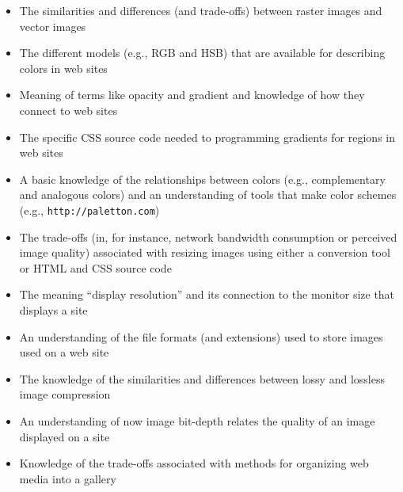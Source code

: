 \documentclass[11pt]{article}
\newcommand{\program}[1]{\lstinline{#1}}
\begin{document}
\begin{itemize}

  \itemsep 0in

  \item The similarities and differences (and trade-offs) between raster images
    and vector images

  \item The different models (e.g., RGB and HSB) that are available for
    describing colors in web sites

  \item Meaning of terms like opacity and gradient and knowledge of how
    they connect to web sites

  \item The specific CSS source code needed to programming gradients for regions
    in web sites

  \item A basic knowledge of the relationships between colors (e.g.,
    complementary and analogous colors) and an understanding of tools that make
    color schemes (e.g., \program{http://paletton.com})

  \item The trade-offs (in, for instance, network bandwidth consumption or
    perceived image quality) associated with resizing images using either a
    conversion tool or HTML and CSS source code

  \item The meaning ``display resolution'' and its connection to the monitor
    size that displays a site

  \item An understanding of the file formats (and extensions) used to store
    images used on a web site

  \item The knowledge of the similarities and differences between lossy and
    lossless image compression

  \item An understanding of now image bit-depth relates the quality of an image
    displayed on a site

  \item Knowledge of the trade-offs associated with methods for organizing web
    media into a gallery

\end{itemize}
\end{document}
